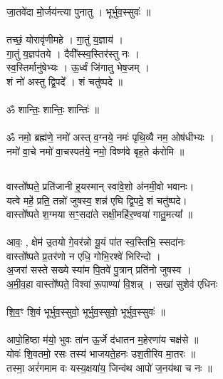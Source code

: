 जा॒तवे॑दा मो॒र्जय॑न्त्या पुनातु । भूर्भुव॒स्सुवः॑ ॥\\
\\
तच्छं॒ योरावृ॑णीमहे । गा॒तुं य॒ज्ञाय॑ ।\\
गा॒तुं य॒ज्ञप॑तये । दैवी᳚स्स्व॒स्तिर॑स्तु नः । \\
स्व॒स्तिर्मानु॑षेभ्यः । ऊ॒र्ध्वं जि॑गातु भेष॒जम् ।\\
शं नो॑ अस्तु द्वि॒पदे᳚ । शं चतु॑ष्पदे ॥\\
\\
ॐ शान्तिः॒ शान्तिः॒ शान्तिः॑ ॥\\
\\
ॐ नमो॒ ब्रह्म॑णे॒ नमो॑ अस्त् व॒ग्नये॒ नमः॑ पृथि॒व्यै नम॒ ओष॑धीभ्यः ।\\
नमो॑ वा॒चे नमो॑ वा॒चस्पत॑ये॒ नमो॒ विष्ण॑वे बृह॒ते क॑रोमि ॥\\
\subsection{}
वास्तो᳚ष्पते॒ प्रति॑जानी ह्॒यस्मान्  स्वा॑वे॒शो अ॑नमी॒वो भवानः। \\
यत्वे महे॒॑ प्रति॒ तन्नो॑ जुषस्व॒ शन्न॑ एघि द्वि॒पदे॒ शं चतु॑ष्पदे। \\
वास्तो᳚ष्पते श॒ग्मया सꣳ॒सदा॑ते सक्षी॒महि॑र॒ण्वया॑ गातु॒मत्या᳚ ॥\\
\\
आवः॒ , क्षेम॑ उ॒तयो गे॒वर॑न्नो यू॒यं पा॑त स्व॒स्तिभि॒ स्सदा॑नः \\
वास्तो᳚ष्पते प्र॒तर॑णो न एधि॒ गोभि॒रश्वे॑ भिरिन्दो ।\\
अ॒जरा॑ सस्ते सख्ये स्या॑म पि॒तवे॑ पु॒त्रान् प्रति॑नो जुषस्व ।\\
अ॒मी॒व॒हा वास्तो᳚ष्पते॒ विश्वा॑ रू॒पाण्या॑ वि॒शन्न् । सखा॑ सुशेव॑ एधिनः \\
\\
शि॒व॒ꣳ शि॒वं भूर्भुव॒स्सुवो॒ भूर्भुव॒स्सुवो॒ भूर्भुव॒स्सुवः॑ ॥\\
\\
आपो॒हिष्ठा म॑यो॒ भुवः ता॑न ऊ॒र्जे द॑धातन म॒हेरणा॑य चक्ष॑से ॥\\
योवः॑ शि॒वतमो॒ रसः तस्य॑ भाजयते॒हनः उश॒तीरिव मा॒तरः ॥\\
तस्मा॒ अरं॑गमाम वः यस्य॒क्षया॑य॒ जिन्व॑थ आपो॑ ज॒नय॑था च नः ॥\\
